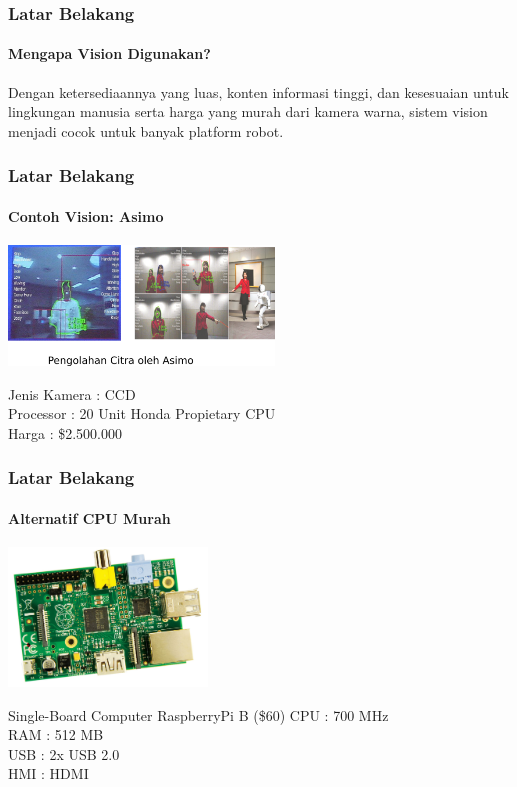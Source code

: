 \documentclass[table,dvipsnames]{beamer}
\begin{document}
\begin{frame}
\frametitle{Latar Belakang}
\framesubtitle{Mengapa Vision Digunakan?}
\begin{block}{\cite{why_vision}}
Dengan ketersediaannya yang luas, konten informasi tinggi, dan kesesuaian untuk lingkungan manusia serta harga yang murah dari kamera warna, sistem vision menjadi cocok untuk banyak platform robot.
\end{block}
\end{frame}

\begin{frame}
\frametitle{Latar Belakang}
\framesubtitle{Contoh Vision: Asimo}
\begin{center}
 \includegraphics[width=200pt]{./latar_belakang/asimo_vision/asimo_vision}
\end{center}
\begin{block}{\cite{asimo_cpu}}
Jenis Kamera : CCD\\
Processor : 20 Unit Honda Propietary CPU\\
Harga : \$2.500.000\\
\end{block}
\end{frame}

\begin{frame}
\frametitle{Latar Belakang}
\framesubtitle{Alternatif CPU Murah}
\begin{center}
 \includegraphics[width=150pt]{./latar_belakang/raspi/raspi}
\end{center}
\begin{block}{Single-Board Computer RaspberryPi B (\$60)}
CPU : 700 MHz\\
RAM : 512 MB\\
USB	: 2x USB 2.0\\
HMI : HDMI\\
\end{block}
\end{frame}
\end{document}
